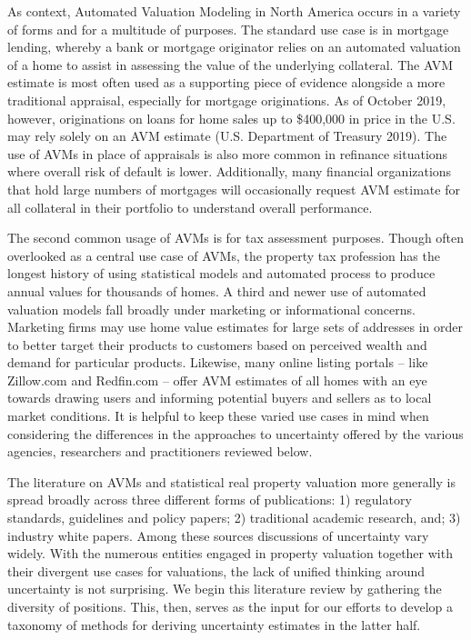 \documentclass[colTwo]{anon}
\theoremstyle{definition}
\begin{document}
As context, Automated Valuation Modeling in North America occurs in a variety of forms and for a multitude of purposes. The standard use case is in mortgage lending, whereby a bank or mortgage originator relies on an automated valuation of a home to assist in assessing the value of the underlying collateral.  The AVM estimate is most often used as a supporting piece of evidence alongside a more traditional appraisal, especially for mortgage originations. As of October 2019, however, originations on loans for home sales up to \$400,000 in price in the U.S. may rely solely on an AVM estimate (U.S. Department of Treasury 2019). The use of AVMs in place of appraisals is also more common in refinance situations where overall risk of default is lower. Additionally, many financial organizations that hold large numbers of mortgages will occasionally request AVM estimate for all collateral in their portfolio to understand overall performance.

The second common usage of AVMs is for tax assessment purposes.  Though often overlooked as a central use case of AVMs, the property tax profession has the longest history of using statistical models and automated process to produce annual values for thousands of homes.  A third and newer use of automated valuation models fall broadly under marketing or informational concerns.  Marketing firms may use home value estimates for large sets of addresses in order to better target their products to customers based on perceived wealth and demand for particular products.  Likewise, many online listing portals -- like Zillow.com and Redfin.com -- offer AVM estimates of all homes with an eye towards drawing users and informing potential buyers and sellers as to local market conditions. It is helpful to keep these varied use cases in mind when considering the differences in the approaches to uncertainty offered by the various agencies, researchers and practitioners reviewed below.

The literature on AVMs and statistical real property valuation more generally is spread broadly across three different forms of publications: 1) regulatory standards, guidelines and policy papers; 2) traditional academic research, and; 3) industry white papers.  Among these sources discussions of uncertainty vary widely.  With the numerous entities engaged in property valuation together with their divergent use cases for valuations, the lack of unified thinking around uncertainty is not surprising.  We begin this literature review by gathering the diversity of positions.  This, then, serves as the input for our efforts to develop a taxonomy of methods for deriving uncertainty estimates in the latter half.
\end{document}
